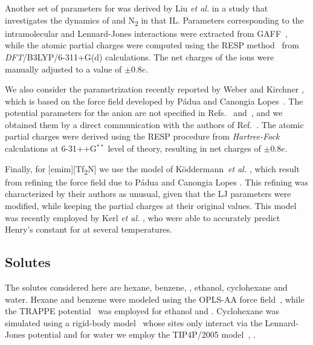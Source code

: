 \documentclass[3p,twocolumn]{elsarticle}
\begin{document}
Another set of parameters for \mbox{\ce{[emim][B(CN)_4]}} was derived by Liu \textit{et al.} \cite{Liu_2014} in a study that investigates the dynamics of  and N\textsubscript{2} in that IL. Parameters corresponding to the intramolecular and Lennard-Jones interactions were extracted from GAFF~\cite{Wang_2004}, while the atomic partial charges were computed using the RESP method~\cite{Bayly_1993} from \textit{DFT}/B3LYP/6-311+G(d) calculations. The net charges of the ions were manually adjusted to a value of $\pm$0.8$e$.

We also consider the parametrization recently reported by Weber and Kirchner \cite{Weber_2016}, which is based on the force field developed by P{\'{a}}dua and Canongia Lopes~\cite{Canongia_Lopes_2006}. The potential parameters for the anion are not specified in Refs.~ and~, and we obtained them by a direct communication with the authors of Ref.~. The atomic partial charges were derived using the RESP procedure from \textit{Hartree-Fock} calculations at 6-31++G$^{\ast \ast}$ level of theory, resulting in net charges of $\pm$0.8$e$.

Finally, for [emim][Tf\textsubscript{2}N] we use the model of K\"{o}ddermann~\textit{et al.} \cite{K_ddermann_2007}, which result from refining the force field due to P{\'{a}}dua and Canongia Lopes \cite{Canongia_Lopes_2006}. This refining was characterized by their authors as unusual, given that the LJ parameters were modified, while keeping the partial charges at their original values. This model was recently employed by Kerl \textit{et al.} \cite{Kerl__2017}, who were able to accurately predict Henry's constant for  at several temperatures.

\subsection{Solutes}
\label{sec:force_field_sol}

The solutes considered here are hexane, benzene, , ethanol, cyclohexane and water. Hexane and benzene were modeled using the OPLS-AA force field~\cite{Jorgensen_1996}, while the TRAPPE potential~\cite{Chen_2001,Potoff_2001} was employed for ethanol and . Cyclohexane was simulated using a rigid-body model~\cite{munoz2015lennard} whose sites only interact via the Lennard-Jones potential and for water we employ the TIP4P/2005 model~\cite{Abascal_2005}, \cite{Vega_2011}. 
\end{document}
